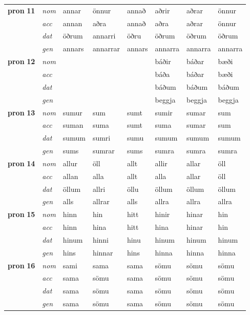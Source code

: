 \begin{longtable}[l]{l>{\footnotesize\itshape}lllllll}
\multirow{3}{*}{{{\textbf{pron} \Large{\textbf{11}}}}}  & nom & annar & önnur    & annað & aðrir & aðrar & önnur \\*
  & acc &  annan  & aðra   & annað & aðra & aðrar & önnur \\*
&  dat & öðrum & annarri   & öðru & öðrum & öðrum & öðrum \\*
  & gen & annars  & annarrar  & annars & annarra & annarra & annarra\\
\cmidrule{1-8}

\multirow{3}{*}{{{\textbf{pron} \Large{\textbf{12}}}}}  & nom &  &     &  & báðir & báðar & bæði \\*
  & acc &    &    &  & báða & báðar & bæði \\*
&  dat &  &    &  & báðum & báðum & báðum \\*
  & gen &   &   &  & beggja & beggja & beggja\\
\cmidrule{1-8}

\multirow{3}{*}{{{\textbf{pron} \Large{\textbf{13}}}}}  & nom & sumur & sum    & sumt & sumir & sumar & sum \\*
  & acc &  suman  & suma   & sumt & suma & sumar & sum \\*
&  dat & sumum & sumri   & sumu & sumum & sumum & sumum \\*
  & gen & sums  & sumrar  & sums & sumra & sumra & sumra\\
\cmidrule{1-8}

\multirow{3}{*}{{{\textbf{pron} \Large{\textbf{14}}}}}  & nom & allur & öll    & allt & allir & allar & öll \\*
  & acc &  allan  & alla   & allt & alla & allar & öll \\*
&  dat & öllum & allri   & öllu & öllum & öllum & öllum \\*
  & gen & alls  & allrar  & alls & allra & allra & allra\\
\cmidrule{1-8}

\multirow{3}{*}{{{\textbf{pron} \Large{\textbf{15}}}}}  & nom & hinn & hin    & hitt & hinir & hinar & hin \\*
  & acc &  hinn  & hina   & hitt & hina & hinar & hin \\*
&  dat & hinum & hinni   & hinu & hinum & hinum & hinum \\*
  & gen & hins  & hinnar  & hins & hinna & hinna & hinna\\
\cmidrule{1-8}

\multirow{3}{*}{{{\textbf{pron} \Large{\textbf{16}}}}}  & nom & sami & sama    & sama & sömu & sömu & sömu \\*
  & acc &  sama  & sömu   & sama & sömu & sömu & sömu \\*
&  dat & sama & sömu   & sama & sömu & sömu & sömu \\*
  & gen & sama  & sömu  & sama & sömu & sömu & sömu\\
\cmidrule{1-8}

\bottomrule
\end{longtable}
